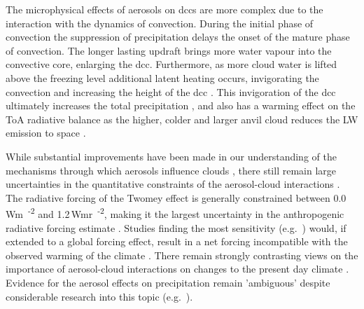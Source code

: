 The microphysical effects of aerosols on \acrshort{dcc}s are more complex due to the interaction with the dynamics of convection.
During the initial phase of convection the suppression of precipitation delays the onset of the mature phase of convection.
The longer lasting updraft brings more water vapour into the convective core, enlarging the \acrshort{dcc}.
Furthermore, as more cloud water is lifted above the freezing level additional latent heating occurs, invigorating the convection and increasing the height of the \acrshort{dcc} \citep{khain2005aerosol}.
This invigoration of the \acrshort{dcc} ultimately increases the total precipitation \citep{koren_aerosol_2005}, and also has a warming effect on the ToA radiative balance as the higher, colder and larger anvil cloud reduces the LW emission to space \citep{rosenfeld_flood_2008,fan_microphysical_2013}.



While substantial improvements have been made in our understanding of the mechanisms through which aerosols influence clouds \citep{fan_review_2016}, there still remain large uncertainties in the quantitative constraints of the aerosol-cloud interactions \citep{IPCCRadiativeForcingMyhre2013}.
The radiative forcing of the Twomey effect is generally constrained between 0.0\,\unit{Wm\textsuperscript{-2}} and 1.2\,\unit{Wmr\textsuperscript{-2}}, making it the largest uncertainty in the anthropogenic radiative forcing estimate \citep{IPCCRadiativeForcingMyhre2013}.
Studies finding the most sensitivity (e.g.\ \citep{rosenfeld_aerosol-driven_2019}) would, if extended to a global forcing effect, result in a net forcing incompatible with the observed warming of the climate \citep{stevens_rethinking_2015}.
There remain strongly contrasting views on the importance of aerosol-cloud interactions on changes to the present day climate \citep{stevens_climate_2012}. 
Evidence for the aerosol effects on precipitation remain 'ambiguous' \citep{IPCCCloudsAeorosolsBoucher2013} despite considerable research into this topic (e.g.\ \citet{levin_aerosol_2008, tao_impact_2012}).


